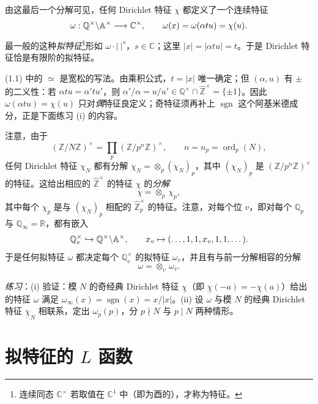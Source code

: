 由这最后一个分解可见，任何 Dirichlet 特征 $\chi$ 都定义了一个连续特征
\[
\omega:\mathbb Q^\times\backslash\mathbb{A}^\times\longrightarrow\mathbb C^\times,\qquad
\omega(x)=\omega(\alpha tu)=\chi(u).
\]
最一般的这种\emph{拟特征}\footnote{连续同态 $\mathbb C^\times$ 若取值在 $\mathbb C^1$ 中（即为酉的），才称为特征。}形如 $\omega\cdot|\ |^s$，$s\in\mathbb C$；这里 $|x|=|\alpha tu|=t$。于是 Dirichlet 特征恰是有限阶的拟特征。

\begin{annote}
(1.1) 中的 $\simeq$ 是宽松的写法。由乘积公式，$t=|x|$ 唯一确定；但 $(\alpha,u)$ 有 $\pm$ 的二义性：若 $\alpha tu=\alpha'tu'$，则 $\alpha'/\alpha=u/u'\in\mathbb Q^\times\cap\widehat{\mathbb Z}^\times=\{\pm1\}$。因此 $\omega(\alpha tu)=\chi(u)$ 只对\emph{偶}特征良定义；奇特征须再补上 $\operatorname{sgn}$ 这个阿基米德成分，正是下面练习 (i) 的内容。
\par\vspace{0.15em}{\raggedleft 【来源：Cassels--Fr\"ohlich《Algebraic Number Theory》第 II 章；Tate 论文 §1（A）】\par}
\end{annote}

注意，由于
\[
(\mathbb Z/N\mathbb Z)^\times=\prod_p(\mathbb Z/p^n\mathbb Z)^\times,\qquad n=n_p=\operatorname{ord}_p(N),
\]
任何 Dirichlet 特征 $\chi_N$ 都有分解 $\chi_N=\otimes_p(\chi_N)_p$，其中 $(\chi_N)_p$ 是 $(\mathbb Z/p^n\mathbb Z)^\times$ 的特征。这给出相应的 $\widehat{\mathbb Z}^\times$ 的特征 $\chi$ 的\emph{分解}
\[
\chi=\otimes_p\,\chi_p,
\]
其中每个 $\chi_p$ 是与 $(\chi_N)_p$ 相配的 $\widehat{\mathbb Z}_p^\times$ 的特征。注意，对每个位 $v$，即对每个 $\mathbb Q_p$ 与 $\mathbb Q_\infty=\mathbb R$，都有嵌入
\[
\mathbb Q_v^\times\hookrightarrow\mathbb Q^\times\backslash\mathbb{A}^\times,\qquad
x_v\mapsto(\dots,1,1,x_v,1,1,\dots).
\]
于是任何拟特征 $\omega$ 都决定每个 $\mathbb Q_v^\times$ 的拟特征 $\omega_v$，并且有与前一分解相容的分解
\begin{equation*}\tag{1.2}
\omega=\otimes_v\,\omega_v.
\end{equation*}

\emph{练习}：(i) 验证：模 $N$ 的奇经典 Dirichlet 特征 $\underline\chi$（即 $\underline\chi(-a)=-\underline\chi(a)$）给出的特征 $\omega$ 满足 $\omega_\infty(x)=\operatorname{sgn}(x)=x/|x|$。(ii) 设 $\omega$ 与模 $N$ 的经典 Dirichlet 特征 $\underline\chi_N$ 相联系，定出 $\omega_p(p)$，分 $p\nmid N$ 与 $p\mid N$ 两种情形。

\section{拟特征的 $L$ 函数}

